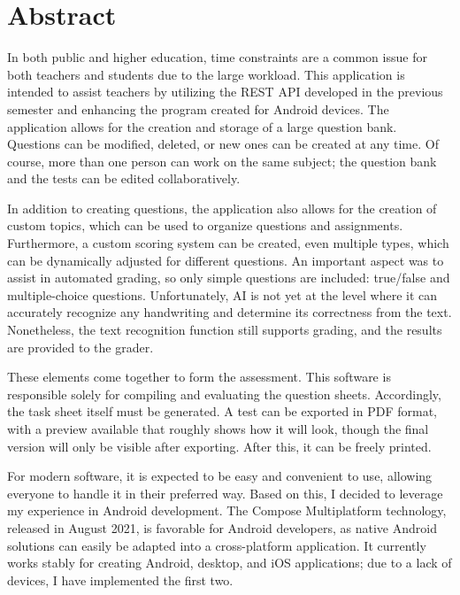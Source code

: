 \vfill
\selectenglish


\chapter*{Abstract}

In both public and higher education, time constraints are a common issue for both teachers and students due to the large workload. 
This application is intended to assist teachers by utilizing the REST API developed in the previous semester and enhancing the program created for Android devices. 
The application allows for the creation and storage of a large question bank. 
Questions can be modified, deleted, or new ones can be created at any time. 
Of course, more than one person can work on the same subject; the question bank and the tests can be edited collaboratively.

In addition to creating questions, the application also allows for the creation of custom topics, which can be used to organize questions and assignments. 
Furthermore, a custom scoring system can be created, even multiple types, which can be dynamically adjusted for different questions. 
An important aspect was to assist in automated grading, so only simple questions are included: true/false and multiple-choice questions. 
Unfortunately, AI is not yet at the level where it can accurately recognize any handwriting and determine its correctness from the text. 
Nonetheless, the text recognition function still supports grading, and the results are provided to the grader.

These elements come together to form the assessment. 
This software is responsible solely for compiling and evaluating the question sheets. 
Accordingly, the task sheet itself must be generated. A test can be exported in PDF format, with a preview available that roughly shows how it will look, though the final version will only be visible after exporting. 
After this, it can be freely printed.

For modern software, it is expected to be easy and convenient to use, allowing everyone to handle it in their preferred way. 
Based on this, I decided to leverage my experience in Android development. 
The Compose Multiplatform technology, released in August 2021, is favorable for Android developers, as native Android solutions can easily be adapted into a cross-platform application. 
It currently works stably for creating Android, desktop, and iOS applications; due to a lack of devices, I have implemented the first two.


\vfill
\selectthesislanguage

\setcounter{romanPage}{\value{page}}
